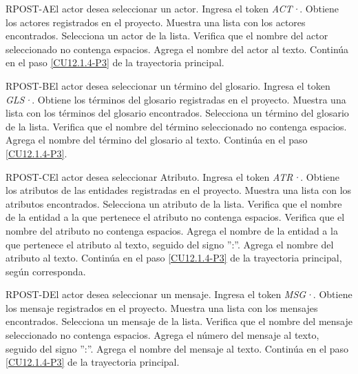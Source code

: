 	\begin{UCtrayectoriaA}{RPOST-A}{El actor desea seleccionar un actor.}
		\UCpaso[\UCactor] Ingresa el token {\em ACT·}.
		\UCpaso[\UCsist] Obtiene los actores registrados en el proyecto. 
		\UCpaso[\UCsist] Muestra una lista con los actores encontrados.
		\UCpaso[\UCactor] Selecciona un actor de la lista.
		\UCpaso[\UCsist] Verifica que el nombre del actor seleccionado no contenga espacios. 
		\UCpaso[\UCsist] Agrega el nombre del actor al texto.
		\UCpaso Continúa en el paso \ref{CU12.1.4-P3} de la trayectoria principal.
	\end{UCtrayectoriaA}

	\begin{UCtrayectoriaA}{RPOST-B}{El actor desea seleccionar un término del glosario.}
		\UCpaso[\UCactor] Ingresa el token {\em GLS·}.
		\UCpaso[\UCsist] Obtiene los términos del glosario registradas en el proyecto. 
		\UCpaso[\UCsist] Muestra una lista con los términos del glosario encontrados.
		\UCpaso[\UCactor] Selecciona un término del glosario de la lista.
		\UCpaso[\UCsist] Verifica que el nombre del término seleccionado no contenga espacios. 
		\UCpaso[\UCsist] Agrega el nombre del término del glosario al texto.
		\UCpaso Continúa en el paso \ref{CU12.1.4-P3}.
	\end{UCtrayectoriaA}

	\begin{UCtrayectoriaA}{RPOST-C}{El actor desea seleccionar Atributo.}
		\UCpaso[\UCactor] Ingresa el token {\em ATR·}. 
		\UCpaso[\UCsist] Obtiene los atributos de las entidades registradas en el proyecto.
		\UCpaso[\UCsist] Muestra una lista con los atributos encontrados.
		\UCpaso[\UCactor] Selecciona un atributo de la lista.
		\UCpaso[\UCsist] Verifica que el nombre de la entidad a la que pertenece el atributo no contenga espacios. 
		\UCpaso[\UCsist] Verifica que el nombre del atributo no contenga espacios. 
		\UCpaso[\UCsist] Agrega el nombre de la entidad a la que pertenece el atributo al texto, seguido del signo '':''.
		\UCpaso[\UCsist] Agrega el nombre del atributo al texto.
		\UCpaso Continúa en el paso \ref{CU12.1.4-P3} de la trayectoria principal, según corresponda.
	\end{UCtrayectoriaA}

	\begin{UCtrayectoriaA}{RPOST-D}{El actor desea seleccionar un mensaje.}
		\UCpaso[\UCactor] Ingresa el token {\em MSG·}. 
		\UCpaso[\UCsist] Obtiene los mensaje registrados en el proyecto.
		\UCpaso[\UCsist] Muestra una lista con los mensajes encontrados.
		\UCpaso[\UCactor] Selecciona un mensaje de la lista.
		\UCpaso[\UCsist] Verifica que el nombre del mensaje seleccionado no contenga espacios. 
		\UCpaso[\UCsist] Agrega el número del mensaje al texto, seguido del signo '':''.
		\UCpaso[\UCsist] Agrega el nombre del mensaje al texto.
		\UCpaso Continúa en el paso \ref{CU12.1.4-P3} de la trayectoria principal.
	\end{UCtrayectoriaA}

